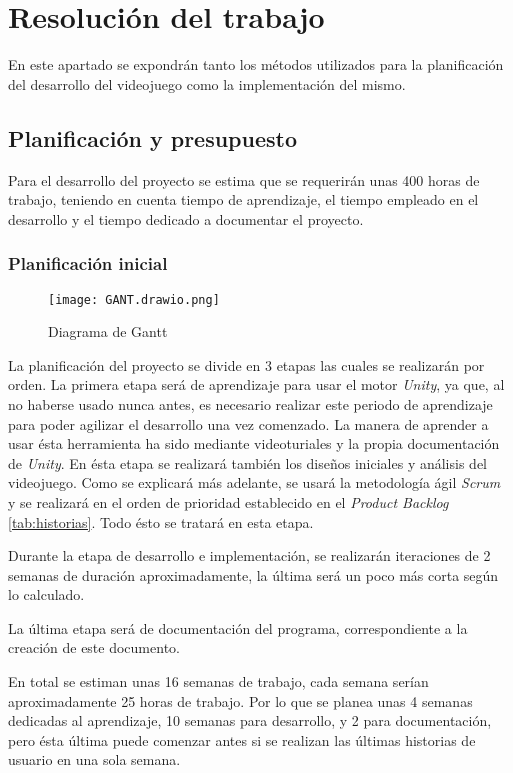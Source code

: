 \chapter{Resolución del trabajo}
\label{chap:resolucion}

En este apartado se expondrán tanto los métodos utilizados para la planificación del 
desarrollo del videojuego como la implementación del mismo.  

\section{Planificación y presupuesto}
\label{sec:planificacion}
Para el desarrollo del proyecto se estima que se requerirán  unas 400 horas de trabajo, teniendo en cuenta tiempo de aprendizaje, el tiempo empleado en el desarrollo y el tiempo dedicado a documentar el proyecto.

\subsection{Planificación inicial}

\begin{figure}[H]
    \centering
    \texttt{[image: GANT.drawio.png]}
    \caption{Diagrama de Gantt}
\end{figure}

La planificación del proyecto se divide en 3 etapas las cuales se realizarán por orden. La primera etapa será de aprendizaje para usar el motor \textit{Unity}, ya que, al no haberse usado nunca antes, es necesario realizar este periodo de aprendizaje para poder agilizar el desarrollo una vez comenzado. La manera de aprender a usar ésta herramienta ha sido mediante videoturiales y la propia documentación de \textit{Unity}. En ésta etapa se realizará también los diseños iniciales y análisis del videojuego. Como se explicará más adelante, se usará la metodología ágil \textit{Scrum} y se realizará en el orden de prioridad establecido en el \textit{Product Backlog} \ref{tab:historias}. Todo ésto se tratará en esta etapa.

Durante la etapa de desarrollo e implementación, se realizarán iteraciones de 2 semanas de duración aproximadamente, la última será un poco más corta según lo calculado. 

La última etapa será de documentación del programa, correspondiente a la creación de este documento.

En total se estiman unas 16 semanas de trabajo, cada semana serían aproximadamente 25 horas de trabajo. Por lo que se planea unas 4 semanas dedicadas al aprendizaje, 10 semanas para desarrollo, y 2 para documentación, pero ésta última puede comenzar antes si se realizan las últimas historias de usuario en una sola semana.

